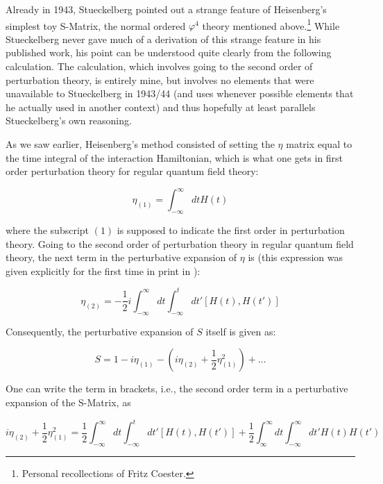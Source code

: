 \documentclass[12pt]{article}
\begin{document}
Already in 1943, Stueckelberg pointed out a strange feature of Heisenberg's simplest toy S-Matrix, the normal ordered $\varphi^4$ theory mentioned above.\footnote{Personal recollections of Fritz Coester.} While Stueckelberg never gave much of a derivation of this strange feature in his published work, his point can be understood quite clearly from the following calculation. The calculation, which involves going to the second order of perturbation theory, is entirely mine, but involves no elements that were unavailable to Stueckelberg in 1943/44 (and uses whenever possible elements that he actually used in another context) and thus hopefully at least parallels Stueckelberg's own reasoning.

As we saw earlier, Heisenberg's method consisted of setting the $\eta$ matrix equal to the time integral of the interaction Hamiltonian, which is what one gets in first order perturbation theory for regular quantum field theory: 

\begin{equation}
\label{eq:pert}
\eta_{(1)}  =  \int_{-\infty}^{\infty} dt H(t) 
\end{equation}

where the subscript $(1)$ is supposed to indicate the first order in perturbation theory. Going to the second order of perturbation theory in regular quantum field theory, the next term in the perturbative expansion of $\eta$ is (this expression was given explicitly for the first time in print in \citep[p.20]{stueckelberg_1944_un-modele}):

\begin{equation}
\eta_{(2)}   =  - \frac{1}{2} i \int_{-\infty}^{\infty} dt \int_{-\infty}^{t} dt' \left[H(t), H(t') \right]
\end{equation}

Consequently, the perturbative expansion of $S$ itself is given as:

\begin{equation}
S = 1 - i  \eta_{(1)} -  \left(i \eta_{(2)} + \frac{1}{2} \eta_{(1)}^2 \right) + \ldots 
\end{equation}

One can write the term in brackets, i.e., the second order term in a perturbative expansion of the S-Matrix, as

\begin{equation}
\label{eq:stueck}
i \eta_{(2)} + \frac{1}{2} \eta_{(1)}^2 =  \frac{1}{2} \int_{-\infty}^{\infty} dt \int_{-\infty}^{t} dt' \left[H(t), H(t') \right] + \frac{1}{2} \int_{\infty}^{\infty} dt \int_{-\infty}^{\infty} dt' H(t)  H(t')
\end{equation}
\end{document}
